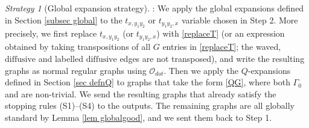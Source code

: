 \documentclass{article}
\newcommand{\1}{\mathds{1}}
\numberwithin{equation}{section}
\renewcommand{\cal}{\mathcal}
\newcommand{\wt}{\widetilde}
\newcommand{\dashed}{\text{diffusive}}
\theoremstyle{plain} %
\theoremstyle{remark}
\newtheorem{strategy}[theorem]{Strategy}
\newcommand{\cor}{\color{red}}
\newcommand{\hty}[1]{{\cor (ht: #1) }}
\begin{document}
\begin{strategy}[Global expansion strategy]
\vspace{5pt}
: We apply the global expansions defined in Section \ref{subsec global} to the $t_{x,y_1y_2}$ or $t_{y_1y_2,x}$ variable chosen in Step 2. More precisely, we first replace $t_{x,y_1y_2}$ (or $t_{y_1y_2,x}$) with \eqref{replaceT} (or an expression obtained by taking transpositions of all $G$ entries in \eqref{replaceT}; the waved, $\dashed$ and labelled $\dashed$ edges are not transposed), and write the resulting graphs as normal regular graphs using $\cal O_{dot}$. Then we apply the $Q$-expansions defined in Section \ref{sec defnQ} to graphs that take the form \eqref{QG}, where both $\Gamma_0$ and \smash{$\wt\Gamma_0$} are non-trivial. 
We send the resulting graphs that already satisfy the stopping rules (S1)--(S4) to the outputs. The remaining graphs are all globally standard by Lemma \ref{lem globalgood}, and we sent them back to Step 1. 
\end{strategy}
\end{document}
